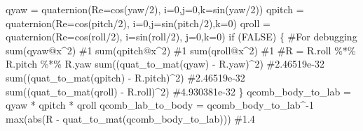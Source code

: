 \documentclass[
  letterpaper,
  DIV=11,
  numbers=noendperiod]{scrartcl}
\newenvironment{Shaded}{\begin{snugshade}}{\end{snugshade}}
\newcommand{\AttributeTok}[1]{\textcolor[rgb]{0.40,0.45,0.13}{#1}}
\newcommand{\CommentTok}[1]{\textcolor[rgb]{0.37,0.37,0.37}{#1}}
\newcommand{\ConstantTok}[1]{\textcolor[rgb]{0.56,0.35,0.01}{#1}}
\newcommand{\ControlFlowTok}[1]{\textcolor[rgb]{0.00,0.23,0.31}{#1}}
\newcommand{\DecValTok}[1]{\textcolor[rgb]{0.68,0.00,0.00}{#1}}
\newcommand{\FunctionTok}[1]{\textcolor[rgb]{0.28,0.35,0.67}{#1}}
\newcommand{\NormalTok}[1]{\textcolor[rgb]{0.00,0.23,0.31}{#1}}
\newcommand{\OtherTok}[1]{\textcolor[rgb]{0.00,0.23,0.31}{#1}}
\newcommand{\SpecialCharTok}[1]{\textcolor[rgb]{0.37,0.37,0.37}{#1}}
\begin{document}
\begin{Shaded}
\begin{Highlighting}[]
\NormalTok{  qyaw }\OtherTok{=} \FunctionTok{quaternion}\NormalTok{(}\AttributeTok{Re=}\FunctionTok{cos}\NormalTok{(yaw}\SpecialCharTok{/}\DecValTok{2}\NormalTok{), }\AttributeTok{i=}\DecValTok{0}\NormalTok{,}\AttributeTok{j=}\DecValTok{0}\NormalTok{,}\AttributeTok{k=}\FunctionTok{sin}\NormalTok{(yaw}\SpecialCharTok{/}\DecValTok{2}\NormalTok{))}
\NormalTok{  qpitch }\OtherTok{=} \FunctionTok{quaternion}\NormalTok{(}\AttributeTok{Re=}\FunctionTok{cos}\NormalTok{(pitch}\SpecialCharTok{/}\DecValTok{2}\NormalTok{), }\AttributeTok{i=}\DecValTok{0}\NormalTok{,}\AttributeTok{j=}\FunctionTok{sin}\NormalTok{(pitch}\SpecialCharTok{/}\DecValTok{2}\NormalTok{),}\AttributeTok{k=}\DecValTok{0}\NormalTok{)}
\NormalTok{  qroll }\OtherTok{=} \FunctionTok{quaternion}\NormalTok{(}\AttributeTok{Re=}\FunctionTok{cos}\NormalTok{(roll}\SpecialCharTok{/}\DecValTok{2}\NormalTok{), }\AttributeTok{i=}\FunctionTok{sin}\NormalTok{(roll}\SpecialCharTok{/}\DecValTok{2}\NormalTok{), }\AttributeTok{j=}\DecValTok{0}\NormalTok{,}\AttributeTok{k=}\DecValTok{0}\NormalTok{)}
  \ControlFlowTok{if}\NormalTok{ (}\ConstantTok{FALSE}\NormalTok{) \{ }\CommentTok{\#For debugging}
    \FunctionTok{sum}\NormalTok{(qyaw}\SpecialCharTok{@}\NormalTok{x}\SpecialCharTok{\^{}}\DecValTok{2}\NormalTok{) }\CommentTok{\#1}
    \FunctionTok{sum}\NormalTok{(qpitch}\SpecialCharTok{@}\NormalTok{x}\SpecialCharTok{\^{}}\DecValTok{2}\NormalTok{) }\CommentTok{\#1}
    \FunctionTok{sum}\NormalTok{(qroll}\SpecialCharTok{@}\NormalTok{x}\SpecialCharTok{\^{}}\DecValTok{2}\NormalTok{) }\CommentTok{\#1}
    \CommentTok{\#R = R.roll \%*\% R.pitch \%*\% R.yaw}
    \FunctionTok{sum}\NormalTok{((}\FunctionTok{quat\_to\_mat}\NormalTok{(qyaw) }\SpecialCharTok{{-}}\NormalTok{ R.yaw)}\SpecialCharTok{\^{}}\DecValTok{2}\NormalTok{) }\CommentTok{\#2.46519e{-}32}
    \FunctionTok{sum}\NormalTok{((}\FunctionTok{quat\_to\_mat}\NormalTok{(qpitch) }\SpecialCharTok{{-}}\NormalTok{ R.pitch)}\SpecialCharTok{\^{}}\DecValTok{2}\NormalTok{) }\CommentTok{\#2.46519e{-}32}
    \FunctionTok{sum}\NormalTok{((}\FunctionTok{quat\_to\_mat}\NormalTok{(qroll) }\SpecialCharTok{{-}}\NormalTok{ R.roll)}\SpecialCharTok{\^{}}\DecValTok{2}\NormalTok{) }\CommentTok{\#4.930381e{-}32}
\NormalTok{  \}}
\NormalTok{  qcomb\_body\_to\_lab }\OtherTok{=}\NormalTok{ qyaw }\SpecialCharTok{*}\NormalTok{ qpitch }\SpecialCharTok{*}\NormalTok{ qroll}
\NormalTok{  qcomb\_lab\_to\_body }\OtherTok{=}\NormalTok{ qcomb\_body\_to\_lab}\SpecialCharTok{\^{}{-}}\DecValTok{1}
  \FunctionTok{max}\NormalTok{(}\FunctionTok{abs}\NormalTok{(R }\SpecialCharTok{{-}} \FunctionTok{quat\_to\_mat}\NormalTok{(qcomb\_body\_to\_lab))) }\CommentTok{\#1.4}
\end{Highlighting}
\end{Shaded}
\end{document}
